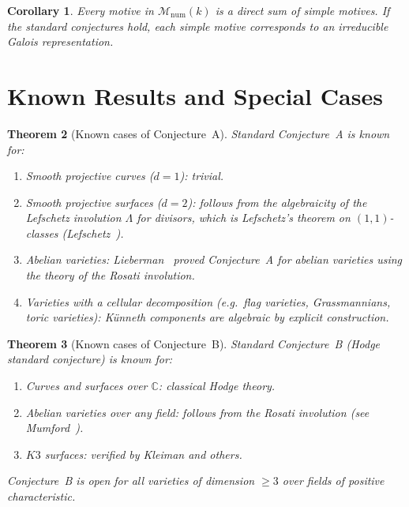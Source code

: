 \documentclass[12pt,a4paper]{amsart}
\newtheorem{theorem}{Theorem}[section]
\newtheorem{corollary}[theorem]{Corollary}
\theoremstyle{definition}
\newcommand{\C}{\mathbb{C}}
\begin{document}
\begin{corollary}
Every motive in $\mathcal{M}_{\mathrm{num}}(k)$ is a direct sum of simple
motives.  If the standard conjectures hold, each simple motive corresponds
to an irreducible Galois representation.
\end{corollary}

\section{Known Results and Special Cases}\label{sec:known}

\begin{theorem}[Known cases of Conjecture~A]
Standard Conjecture~A is known for:
\begin{enumerate}[label=(\roman*)]
  \item Smooth projective curves ($d=1$): trivial.
  \item Smooth projective surfaces ($d=2$): follows from the algebraicity of
        the Lefschetz involution $\Lambda$ for divisors, which is Lefschetz's
        theorem on $(1,1)$-classes (Lefschetz~\cite{lefschetz1924}).
  \item Abelian varieties: Lieberman~\cite{lieberman1968} proved Conjecture~A
        for abelian varieties using the theory of the Rosati involution.
  \item Varieties with a cellular decomposition (e.g.\ flag varieties,
        Grassmannians, toric varieties): K\"unneth components are algebraic
        by explicit construction.
\end{enumerate}
\end{theorem}

\begin{theorem}[Known cases of Conjecture~B]
Standard Conjecture~B (Hodge standard conjecture) is known for:
\begin{enumerate}[label=(\roman*)]
  \item Curves and surfaces over $\C$: classical Hodge theory.
  \item Abelian varieties over any field: follows from the Rosati involution
        (see Mumford~\cite{mumford1970}).
  \item $K3$ surfaces: verified by Kleiman and others.
\end{enumerate}
Conjecture~B is \emph{open} for all varieties of dimension $\geq 3$ over fields
of positive characteristic.
\end{theorem}
\end{document}
